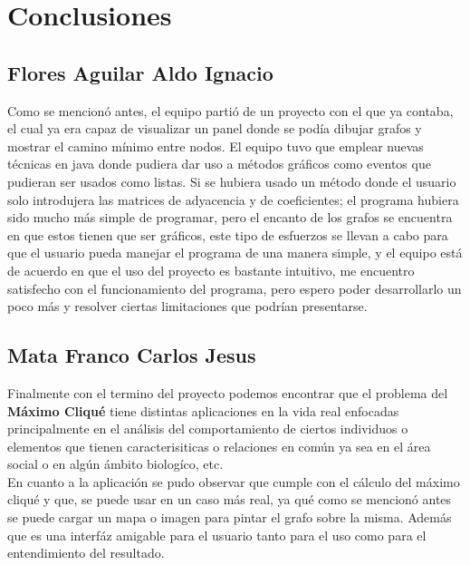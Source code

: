 \chapter{Conclusiones}

\section{Flores Aguilar Aldo Ignacio}
Como se mencionó antes, el equipo partió de un proyecto con el que ya contaba, el cual ya era capaz de visualizar un panel donde se podía dibujar grafos y mostrar el camino mínimo entre nodos. El equipo tuvo que emplear nuevas técnicas en java donde pudiera dar uso a métodos gráficos como eventos que pudieran ser usados como listas. Si se hubiera usado un método donde el usuario solo introdujera las matrices de adyacencia y de coeficientes; el programa hubiera sido mucho más simple de programar, pero el encanto de los grafos se encuentra en que estos tienen que ser gráficos, este tipo de esfuerzos se llevan a cabo para que el usuario pueda manejar el programa de una manera simple, y el equipo está de acuerdo en que el uso del proyecto es bastante intuitivo, me encuentro satisfecho con el funcionamiento del programa, pero espero poder desarrollarlo un poco más y resolver ciertas limitaciones que podrían presentarse.


\section{Mata Franco Carlos Jesus}
Finalmente con el termino del proyecto podemos encontrar que el problema del \textbf{Máximo Cliqué} tiene distintas aplicaciones en la vida real enfocadas principalmente en el análisis del comportamiento de ciertos individuos o elementos que tienen caracterisiticas o relaciones en común ya sea en el área social o en algún ámbito biologíco, etc. 
\\
En cuanto a la aplicación se pudo observar que cumple con el cálculo del máximo cliqué y que, se puede usar en un caso más real, ya qué como se mencionó antes se puede cargar un mapa o imagen para pintar el grafo sobre la misma. Además que es una interfáz amigable para el usuario tanto para el uso como para el entendimiento del resultado. 


